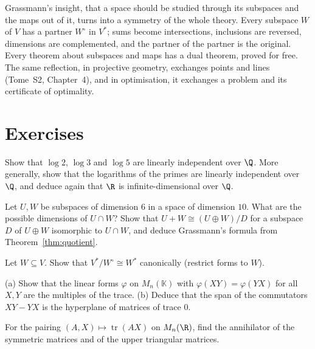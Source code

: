 \begin{beauty}
Grassmann's insight, that a space should be studied through its subspaces and the maps out of it, turns into a
symmetry of the whole theory. Every subspace $W$ of $V$ has a partner $W^\circ$ in $V^*$; sums become intersections,
inclusions are reversed, dimensions are complemented, and the partner of the partner is the original. Every theorem
about subspaces and maps has a dual theorem, proved for free. The same reflection, in projective geometry, exchanges
points and lines (Tome~S2, Chapter~4), and in optimisation, it exchanges a problem and its certificate of optimality.
\end{beauty}

\section{Exercises}

\begin{exercise}[$\star$]\label{ex:logs}
Show that $\log2$, $\log3$ and $\log5$ are linearly independent over $\Q$. More generally, show that the logarithms of
the primes are linearly independent over $\Q$, and deduce again that $\R$ is infinite-dimensional over $\Q$.
\end{exercise}

\begin{exercise}[$\star$]\label{ex:grassmann}
Let $U,W$ be subspaces of dimension $6$ in a space of dimension $10$. What are the possible dimensions of $U\cap W$?
Show that $U+W\cong(U\oplus W)/D$ for a subspace $D$ of $U\oplus W$ isomorphic to $U\cap W$, and deduce Grassmann's
formula from Theorem~\ref{thm:quotient}.
\end{exercise}

\begin{exercise}[$\star$]\label{ex:quotientdual}
Let $W\subseteq V$. Show that $V^*/W^\circ\cong W^*$ canonically (restrict forms to $W$).
\end{exercise}

\begin{exercise}[$\star\star$]\label{ex:traceform}
(a) Show that the linear forms $\varphi$ on $M_n(\mathbb K)$ with $\varphi(XY)=\varphi(YX)$ for all $X,Y$ are the multiples of the
trace. (b) Deduce that the span of the commutators $XY-YX$ is the hyperplane of matrices of trace $0$.
\end{exercise}

\begin{exercise}[$\star$]\label{ex:symanti}
For the pairing $(A,X)\mapsto\operatorname{tr}(AX)$ on $M_n(\R)$, find the annihilator of the symmetric matrices and of the
upper triangular matrices.
\end{exercise}

